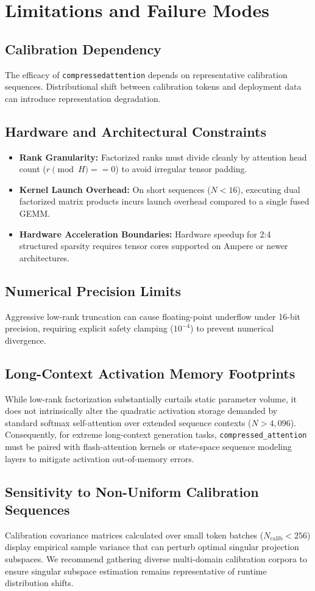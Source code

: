 \section{Limitations and Failure Modes}

\subsection{Calibration Dependency}
The efficacy of \texttt{compressedattention} depends on representative calibration sequences. Distributional shift between calibration tokens and deployment data can introduce representation degradation.

\subsection{Hardware and Architectural Constraints}
\begin{itemize}
\item \textbf{Rank Granularity:} Factorized ranks must divide cleanly by attention head count ($r \pmod H == 0$) to avoid irregular tensor padding.
\item \textbf{Kernel Launch Overhead:} On short sequences ($N < 16$), executing dual factorized matrix products incurs launch overhead compared to a single fused GEMM.
\item \textbf{Hardware Acceleration Boundaries:} Hardware speedup for 2:4 structured sparsity requires tensor cores supported on Ampere or newer architectures.
\end{itemize}

\subsection{Numerical Precision Limits}
Aggressive low-rank truncation can cause floating-point underflow under 16-bit precision, requiring explicit safety clamping ($10^{-4}$) to prevent numerical divergence.

\subsection{Long-Context Activation Memory Footprints}
While low-rank factorization substantially curtails static parameter volume, it does not intrinsically alter the quadratic activation storage demanded by standard softmax self-attention over extended sequence contexts ($N > 4{,}096$). Consequently, for extreme long-context generation tasks, \texttt{compressed\_attention} must be paired with flash-attention kernels or state-space sequence modeling layers to mitigate activation out-of-memory errors.

\subsection{Sensitivity to Non-Uniform Calibration Sequences}
Calibration covariance matrices calculated over small token batches ($N_{\text{calib}} < 256$) display empirical sample variance that can perturb optimal singular projection subspaces. We recommend gathering diverse multi-domain calibration corpora to ensure singular subspace estimation remains representative of runtime distribution shifts.
